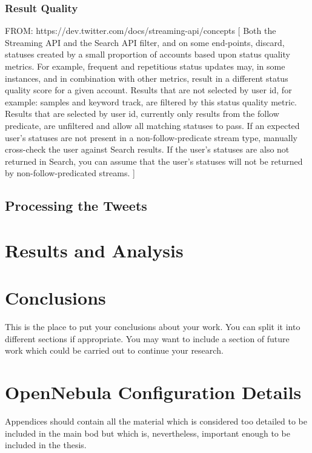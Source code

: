 \documentclass[12pt,a4paper]{report}
\begin{document}
\subsection{Result Quality}

FROM: https://dev.twitter.com/docs/streaming-api/concepts
[
Both the Streaming API and the Search API filter, and on some end-points,
discard, statuses created by a small proportion of accounts based upon status
quality metrics. For example, frequent and repetitious status updates may,
in some instances, and in combination with other metrics, result in a
different status quality score for a given account. Results that are not selected
by user id, for example: samples and keyword track, are filtered by this
status quality metric. Results that are selected by user id, currently only
results from the follow predicate, are unfiltered and allow all
matching statuses to pass. If an expected user's statuses are not present in a
non-follow-predicate stream type, manually cross-check the user against Search
results. If the user's statuses are also not returned in Search, you can assume
that the user's statuses will not be returned by non-follow-predicated streams.
]

\section{Processing the Tweets}

\chapter{Results and Analysis}


\chapter{Conclusions}

This is the place to put your conclusions about your work. You can
split it into different sections if appropriate. You may want to include
a section of future work which could be carried out to continue your
research.

\appendix

\chapter{OpenNebula Configuration Details}

Appendices should contain all the material which is considered too
detailed to be included in the main bod but which is, nevertheless,
important enough to be included in the thesis. 
\end{document}
